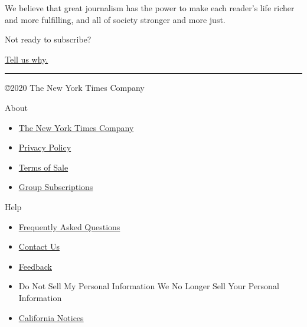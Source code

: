 We believe that great journalism has the power to make each reader's
life richer and more fulfilling, and all of society stronger and more
just.

Not ready to subscribe?

\href{http://nyt.qualtrics.com/jfe/form/SV_6xph8FSrgDdOgap?}{Tell us
why.}

\begin{center}\rule{0.5\linewidth}{\linethickness}\end{center}

©2020 The New York Times Company

About

\begin{itemize}
\tightlist
\item
  \href{https://www.nytco.com/}{The New York Times Company}
\item
  \href{https://www.nytimes3xbfgragh.onion/privacy}{Privacy Policy}
\item
  \href{https://www.nytimes3xbfgragh.onion/content/help/rights/sale/terms-of-sale.html}{Terms
  of Sale}
\item
  \href{https://nytimesgroupsubscriptions.com/?Pardot_Campaign_Code_Form_Input=74KRY}{Group
  Subscriptions}
\end{itemize}

Help

\begin{itemize}
\tightlist
\item
  \href{https://www.nytimes3xbfgragh.onion/content/help/account/purchases/subscriptions-and-purchases.html}{Frequently
  Asked Questions}
\item
  \href{https://help.nytimes3xbfgragh.onion/hc/en-us/articles/115015385887-Contact-us}{Contact
  Us}
\item
  \href{https://myaccount.nytimes3xbfgragh.onion/membercenter/feedback.html}{Feedback}
\item
  Do Not Sell My Personal Information We No Longer Sell Your Personal
  Information
\item
  \href{https://www.nytimes3xbfgragh.onion/privacy/california-notice}{California
  Notices}
\end{itemize}
